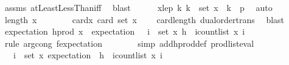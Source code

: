\begin{isabellebody}
\ assms{\isacharparenleft}{\kern0pt}{}{\isacharparenright}{\kern0pt}\ atLeastLessThan{\isacharunderscore}{\kern0pt}iff\ \isamarkupfalse%
\ blast\isanewline
\ \ \ \ \isamarkupfalse%
\ x{\isacharunderscore}{\kern0pt}le{\isacharunderscore}{\kern0pt}p{\isacharcolon}{\kern0pt}\ {\isachardoublequoteopen}{\isasymAnd}k{\isachardot}{\kern0pt}\ k\ {\isasymin}\ set\ x\ {\isasymLongrightarrow}\ k\ {\isacharless}{\kern0pt}\ p{\isachardoublequoteclose}\ \isamarkupfalse%
\ auto\isanewline
\ \ \ \ \isamarkupfalse%
\ {\isachardoublequoteopen}length\ x\ {\isasymle}\ {}{\isachardoublequoteclose}\isanewline
\ \ \ \ \isamarkupfalse%
\ card{\isacharunderscore}{\kern0pt}x{\isacharcolon}{\kern0pt}\ {\isachardoublequoteopen}card\ {\isacharparenleft}{\kern0pt}set\ x{\isacharparenright}{\kern0pt}\ {\isasymle}\ {}{\isachardoublequoteclose}\ \isamarkupfalse%
\ card{\isacharunderscore}{\kern0pt}length\ dual{\isacharunderscore}{\kern0pt}order{\isachardot}{\kern0pt}trans\ \isamarkupfalse%
\ blast\isanewline
\isanewline
\ \ \ \ \isamarkupfalse%
\ {\isachardoublequoteopen}expectation\ {\isacharparenleft}{\kern0pt}h{\isacharunderscore}{\kern0pt}prod\ x{\isacharparenright}{\kern0pt}\ {\isacharequal}{\kern0pt}\ expectation\ {\isacharparenleft}{\kern0pt}{\isasymlambda}{\isasymomega}{\isachardot}{\kern0pt}\ {\isasymProd}\ i\ {\isasymin}\ set\ x{\isachardot}{\kern0pt}\ h\ {\isasymomega}\ i{\isacharcircum}{\kern0pt}{\isacharparenleft}{\kern0pt}count{\isacharunderscore}{\kern0pt}list\ x\ i{\isacharparenright}{\kern0pt}{\isacharparenright}{\kern0pt}{\isachardoublequoteclose}\isanewline
\ \ \ \ \ \ \isamarkupfalse%
\ {\isacharparenleft}{\kern0pt}rule\ arg{\isacharunderscore}{\kern0pt}cong{\isacharbrackleft}{\kern0pt}\ f{\isacharequal}{\kern0pt}{\isachardoublequoteopen}expectation{\isachardoublequoteclose}{\isacharbrackright}{\kern0pt}{\isacharparenright}{\kern0pt}\isanewline
\ \ \ \ \ \ \isamarkupfalse%
\ {\isacharparenleft}{\kern0pt}simp\ add{\isacharcolon}{\kern0pt}h{\isacharunderscore}{\kern0pt}prod{\isacharunderscore}{\kern0pt}def\ prod{\isacharunderscore}{\kern0pt}list{\isacharunderscore}{\kern0pt}eval{\isacharparenright}{\kern0pt}\isanewline
\ \ \ \ \isamarkupfalse%
\ \isamarkupfalse%
\ {\isachardoublequoteopen}{\isachardot}{\kern0pt}{\isachardot}{\kern0pt}{\isachardot}{\kern0pt}\ {\isacharequal}{\kern0pt}\ {\isacharparenleft}{\kern0pt}{\isasymProd}i\ {\isasymin}\ set\ x{\isachardot}{\kern0pt}\ expectation\ {\isacharparenleft}{\kern0pt}{\isasymlambda}{\isasymomega}{\isachardot}{\kern0pt}\ h\ {\isasymomega}\ i{\isacharcircum}{\kern0pt}{\isacharparenleft}{\kern0pt}count{\isacharunderscore}{\kern0pt}list\ x\ i{\isacharparenright}{\kern0pt}{\isacharparenright}{\kern0pt}{\isacharparenright}{\kern0pt}{\isachardoublequoteclose}\isanewline

\end{isabellebody}
